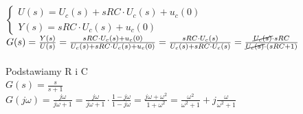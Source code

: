 $\begin{cases}
U(s)=U_c(s)+sRC\cdot U_c(s)+u_c(0)\\
Y(s)=sRC\cdot U_c(s)+u_c(0)
\end{cases}$\\
$G(s)=\frac{Y(s)}{U(s)}=\frac{sRC\cdot U_c(s)+u_c(0)}{U_c(s)+sRC\cdot U_c(s)+u_c(0)}=\frac{sRC\cdot U_c(s)}{U_c(s)+sRC\cdot U_c(s)}=\frac{\cancel{U_c(s)}\cdot sRC}{\cancel{U_c(s)}\cdot (sRC+1)}$\\\\
Podstawiamy R i C\\
$G(s)=\frac{s}{s+1}$\\
$G(j\omega)=\frac{j\omega}{j\omega+1}=\frac{j\omega}{j\omega+1}\cdot \frac{1-j\omega}{1-j\omega}=\frac{j\omega+\omega^2}{1+\omega^2}=\frac{\omega^2}{\omega^2+1}+j\frac{\omega}{\omega^2+1}$



\pagebreak
